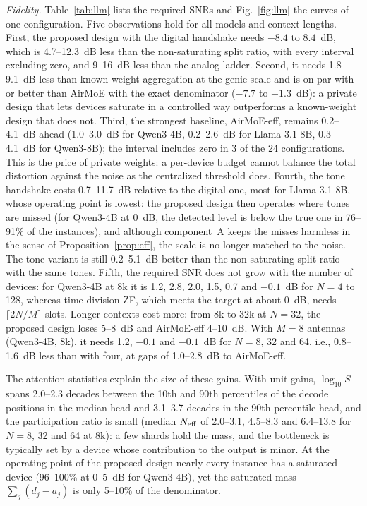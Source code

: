 \emph{Fidelity.} Table~\ref{tab:llm} lists the required SNRs and Fig.~\ref{fig:llm} the curves of one configuration. Five observations hold for all models and context lengths. First, the proposed design with the digital handshake needs $-8.4$ to $8.4$~dB, which is 4.7--12.3~dB less than the non-saturating split ratio, with every interval excluding zero, and 9--16~dB less than the analog ladder. Second, it needs 1.8--9.1~dB less than known-weight aggregation at the genie scale and is on par with or better than AirMoE with the exact denominator ($-7.7$ to $+1.3$~dB): a private design that lets devices saturate in a controlled way outperforms a known-weight design that does not. Third, the strongest baseline, AirMoE-eff, remains 0.2--4.1~dB ahead (1.0--3.0~dB for Qwen3-4B, 0.2--2.6~dB for Llama-3.1-8B, 0.3--4.1~dB for Qwen3-8B); the interval includes zero in 3 of the 24 configurations. This is the price of private weights: a per-device budget cannot balance the total distortion against the noise as the centralized threshold does. Fourth, the tone handshake costs 0.7--11.7~dB relative to the digital one, most for Llama-3.1-8B, whose operating point is lowest: the proposed design then operates where tones are missed (for Qwen3-4B at 0~dB, the detected level is below the true one in 76--91\% of the instances), and although component~A keeps the misses harmless in the sense of Proposition~\ref{prop:eff}, the scale is no longer matched to the noise. The tone variant is still 0.2--5.1~dB better than the non-saturating split ratio with the same tones. Fifth, the required SNR does not grow with the number of devices: for Qwen3-4B at 8k it is 1.2, 2.8, 2.0, 1.5, 0.7 and $-0.1$~dB for $N=4$ to 128, whereas time-division ZF, which meets the target at about 0~dB, needs $\lceil2N/M\rceil$ slots. Longer contexts cost more: from 8k to 32k at $N=32$, the proposed design loses 5--8~dB and AirMoE-eff 4--10~dB. With $M=8$ antennas (Qwen3-4B, 8k), it needs 1.2, $-0.1$ and $-0.1$~dB for $N=8$, 32 and 64, i.e., 0.8--1.6~dB less than with four, at gaps of 1.0--2.8~dB to AirMoE-eff.

The attention statistics explain the size of these gains. With unit gains, $\log_{10}S$ spans 2.0--2.3 decades between the 10th and 90th percentiles of the decode positions in the median head and 3.1--3.7 decades in the 90th-percentile head, and the participation ratio is small (median $N_{\mathrm{eff}}$ of 2.0--3.1, 4.5--8.3 and 6.4--13.8 for $N=8$, 32 and 64 at 8k): a few shards hold the mass, and the bottleneck is typically set by a device whose contribution to the output is minor. At the operating point of the proposed design nearly every instance has a saturated device (96--100\% at 0--5~dB for Qwen3-4B), yet the saturated mass $\sum_j(d_j-a_j)$ is only 5--10\% of the denominator.

